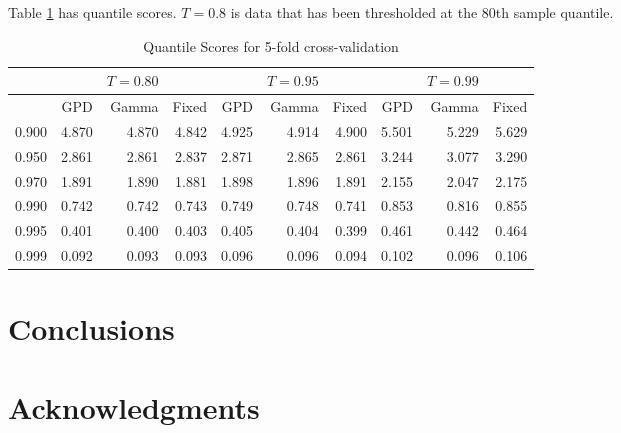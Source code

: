 \documentclass[11pt]{article}
\begin{document}
Table \ref{lbl:quant-5fold} has quantile scores. $T=0.8$ is data that has been thresholded at the 80th sample quantile.
\begin{table}[htdp]
\caption{Quantile Scores for 5-fold cross-validation}
\begin{center}
\begin{tabular}{r|rrr|rrr|rrr|}
	\hline
	&&	$T=0.80$&	&	&$T=0.95$	&	&	&$T=0.99$	&	\\
	\hline
			&GPD& Gamma & Fixed & GPD & Gamma & Fixed & GPD &Gamma & Fixed\\
	\hline
	0.900	&4.870	&4.870	&4.842	&4.925	&4.914	&4.900	&5.501	&5.229	&5.629 \\
	\hline
	0.950	&2.861	&2.861	&2.837	&2.871	&2.865	&2.861	&3.244	&3.077	&3.290 \\
	\hline
	0.970	&1.891	&1.890	&1.881	&1.898	&1.896	&1.891	&2.155	&2.047	&2.175 \\
	\hline
	0.990	&0.742	&0.742	&0.743	&0.749	&0.748	&0.741	&0.853	&0.816	&0.855 \\
	\hline
	0.995	&0.401	&0.400	&0.403	&0.405	&0.404	&0.399	&0.461	&0.442	&0.464 \\
	\hline
	0.999	&0.092	&0.093	&0.093	&0.096	&0.096	&0.094	&0.102	&0.096	&0.106 \\
	\hline
\end{tabular}
\end{center}
\label{lbl:quant-5fold}
\end{table}%

\section{Conclusions}\label{s:con}

\section*{Acknowledgments}
\end{document}
